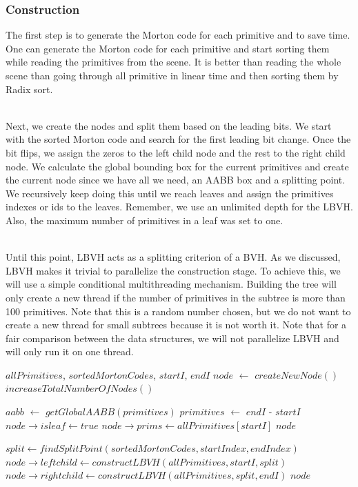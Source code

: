 \documentclass[11pt,a4paper]{article}
\begin{document}
\subsubsection{Construction}
The first step is to generate the Morton code for each primitive and to save time. One can generate the Morton code for each primitive and start sorting them while reading the primitives from the scene. It is better than reading the whole scene than going through all primitive in linear time and then sorting them by Radix sort.

\noindent
\\
Next, we create the nodes and split them based on the leading bits. We start with the sorted Morton code and search for the first leading bit change. Once the bit flips, we assign the zeros to the left child node and the rest to the right child node. We calculate the global bounding box for the current primitives and create the current node since we have all we need, an AABB box and a splitting point. We recursively keep doing this until we reach leaves and assign the primitives indexes or ids to the leaves. Remember, we use an unlimited depth for the LBVH. Also, the maximum number of primitives in a leaf was set to one.

\noindent
\\
Until this point, LBVH acts as a splitting criterion of a BVH. As we discussed, LBVH makes it trivial to parallelize the construction stage. To achieve this, we will use a simple conditional multithreading mechanism. Building the tree will only create a new thread if the number of primitives in the subtree is more than 100 primitives. Note that this is a random number chosen, but we do not want to create a new thread for small subtrees because it is not worth it. Note that for a fair comparison between the data structures, we will not parallelize LBVH and will only run it on one thread. 


\begin{algorithm}[H]
\caption{$constructLBVH$}\label{alg:alg1}
\begin{algorithmic}
		\Require $allPrimitives$, $sortedMortonCodes$, $startI$, $endI$
\State $node$ $\gets$ $createNewNode()$
\State $increaseTotalNumberOfNodes()$

\State $aabb$ $\gets$ $getGlobalAABB(primitives)$
\State $primitives$ $\gets$  $endI$ - $startI$
	\State $node \rightarrow isleaf \gets true$
	\State $node \rightarrow prims \gets allPrimitives[startI]$
	\State \Return $node$
\EndIf

\State $split \gets findSplitPoint(sortedMortonCodes, startIndex, endIndex)$
\State $node \rightarrow leftchild  \gets constructLBVH(allPrimitives, startI, split)$
\State $node \rightarrow rightchild  \gets constructLBVH(allPrimitives, split, endI)$
\State \Return $node$
\end{algorithmic}
\end{algorithm}
\clearpage
\end{document}
